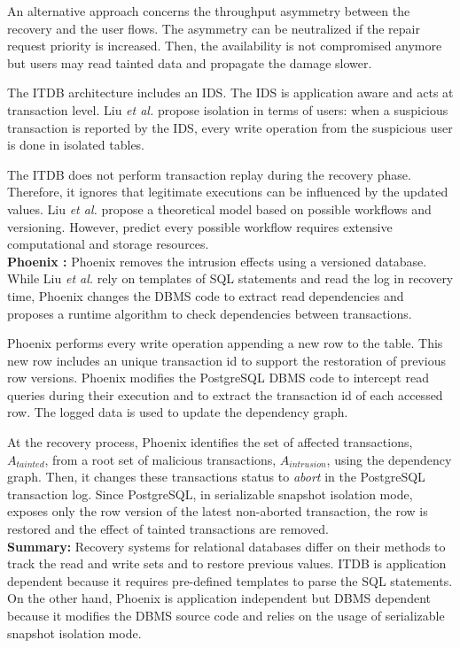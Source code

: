 An alternative approach concerns the throughput asymmetry between the recovery and the user flows. The asymmetry can be neutralized if the repair request priority is increased. Then, the availability is not compromised anymore but users may read tainted data and propagate the damage slower. 

The ITDB architecture includes an \ac{IDS}. The \ac{IDS} is application aware and acts at transaction level. Liu \textit{et al.} propose isolation in terms of users: when a suspicious transaction is reported by the \ac{IDS}, every write operation from the suspicious user is done in isolated tables.

The ITDB does not perform transaction replay during the recovery phase. Therefore, it ignores that legitimate executions can be influenced by the updated values. Liu \textit{et al.} propose a theoretical model \cite{Yu2003} based on possible workflows and versioning. However, predict every possible workflow requires extensive computational and storage resources. \\


\textbf{Phoenix \cite{phoenix}:} Phoenix removes the intrusion effects using a versioned database. While Liu \textit{et al.} \cite{Ammann2002} rely on templates of \ac{SQL} statements and read the log in recovery time, Phoenix changes the \ac{DBMS} code to extract read dependencies and proposes a runtime algorithm to check dependencies between transactions.

Phoenix performs every write operation appending a new row to the table. This new row includes an unique transaction id to support the restoration of previous row versions. Phoenix modifies the PostgreSQL \ac{DBMS} code to intercept read queries during their execution and to extract the transaction id of each accessed row. The logged data is used to update the dependency graph.

At the recovery process, Phoenix identifies the set of affected transactions, $A_{tainted}$, from a root set of malicious transactions, $A_{intrusion}$, using the dependency graph. Then, it changes these transactions status to \textit{abort} in the PostgreSQL transaction log. Since PostgreSQL, in serializable snapshot isolation mode, exposes only the row version of the latest non-aborted transaction, the row is restored and the effect of tainted transactions are removed.\\


\textbf{Summary:} Recovery systems for relational databases differ on their methods to track the read and write sets and to restore previous values. ITDB is application dependent because it requires pre-defined templates to parse the \ac{SQL} statements. On the other hand, Phoenix is application independent but \ac{DBMS} dependent because it modifies the \ac{DBMS} source code and relies on the usage of serializable snapshot isolation mode. 

